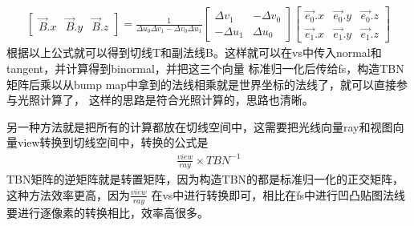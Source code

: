 \begin{gather*}
\begin{bmatrix}
        \overrightarrow{B}.x & \overrightarrow{B}.y & \overrightarrow{B}.z  
    \end{bmatrix} = \frac{1}{\Delta u_{0} \Delta v_{1} - \Delta v_{0} \Delta u_{1}} \begin{bmatrix}
        \Delta v_{1} & -\Delta v_{0} \\ 
        -\Delta u_{1} & \Delta u_{0}
    \end{bmatrix} \begin{bmatrix}
        \overrightarrow{e_{0}}.x & \overrightarrow{e_{0}}.y & \overrightarrow{e_{0}}.z \\ 
        \overrightarrow{e_{1}}.x & \overrightarrow{e_{1}}.y & \overrightarrow{e_{1}}.z  
    \end{bmatrix} 
\end{gather*}
根据以上公式就可以得到切线T和副法线B。这样就可以在vs中传入normal和tangent，并计算得到binormal，并把这三个向量
标准归一化后传给fs，构造TBN矩阵后乘以从bump map中拿到的法线相乘就是世界坐标的法线了，就可以直接参与光照计算了，
这样的思路是符合光照计算的，思路也清晰。

\par
另一种方法就是把所有的计算都放在切线空间中，这需要把光线向量ray和视图向量view转换到切线空间中，转换的公式是
\begin{gather*}
    \frac{view}{ray} \times TBN^{-1}
\end{gather*}
TBN矩阵的逆矩阵就是转置矩阵，因为构造TBN的都是标准归一化的正交矩阵，这种方法效率更高，因为$\frac{view}{ray}$
在vs中进行转换即可，相比在fs中进行凹凸贴图法线要进行逐像素的转换相比，效率高很多。